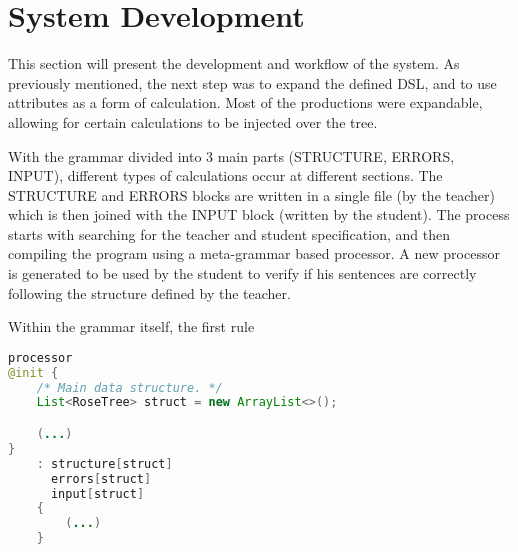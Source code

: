 \chapter{System Development} \label{system_workflow}

This section will present the development and workflow of the system. As previously mentioned, the next step was to expand the defined DSL, and to use attributes as a form of calculation. Most of the productions were expandable, allowing for certain calculations to be injected over the tree.

With the grammar divided into 3 main parts (STRUCTURE, ERRORS, INPUT), different types of calculations occur at different sections. The STRUCTURE and ERRORS blocks are written in a single file (by the teacher) which is then joined 
with the INPUT block (written by the student). The process starts with searching for the teacher and student specification, and then compiling the program using a meta-grammar based processor. A new processor is generated to be 
used by the student to verify if his sentences are correctly following the structure defined by the teacher.

Within the grammar itself, the first rule
\newpage

%

\begin{center}
\begin{minipage}{11cm}
\begin{lstlisting}[language=java, basicstyle=\small, label={lst:processor}, caption=Processor rule from the meta-grammar]
processor
@init {
    /* Main data structure. */
    List<RoseTree> struct = new ArrayList<>();

    (...)
}
    : structure[struct]
      errors[struct]
      input[struct]
    {
        (...)
    }
\end{lstlisting}
\end{minipage}
\end{center}

